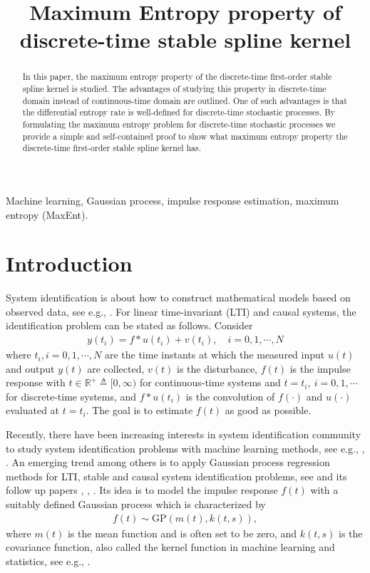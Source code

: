 \documentclass{article}
\title{Maximum Entropy property of discrete-time  stable spline kernel}
\begin{document}
\maketitle
\begin{abstract}
In this paper, the maximum entropy property of the discrete-time
first-order stable spline kernel is studied. The advantages of
studying this property in discrete-time domain instead of
continuous-time domain are outlined. One of such advantages is that
the differential entropy rate is well-defined for discrete-time
stochastic processes. By formulating the maximum entropy problem for
discrete-time stochastic processes we provide a simple and
self-contained proof to show what maximum entropy property
the discrete-time first-order stable spline kernel has.
\end{abstract}
\begin{keywords}
Machine learning, Gaussian process, impulse response estimation,
maximum entropy (MaxEnt).\end{keywords}
\section{Introduction}
\label{sec:intro} System identification is about how to construct
mathematical models based on observed data, see e.g.,
\cite{Ljung:99}. For linear time-invariant (LTI) and causal systems,
the identification problem can be stated as follows. Consider
\begin{align}
  y(t_i) = f*u(t_i) + v(t_i), \quad i=0,1,\cdots, N
\end{align}
where $t_i,i=0,1,\cdots,N$ are the time instants at which the
measured input $u(t)$ and output $y(t)$ are collected, $v(t)$ is the
disturbance, $f(t)$ is the impulse response with $t\in\mathbb
R^+\triangleq[0, \infty)$ for continuous-time systems and
$t=t_i,\ i=0,1,\cdots$ for discrete-time systems, and $f*u(t_i)$ is
the convolution of $f(\cdot)$ and $u(\cdot)$ evaluated at $t=t_i$.
The goal is to estimate $f(t)$ as good as possible.



Recently, there have been increasing interests in system
identification community to study system identification problems
with machine learning methods, see e.g., \cite{LHO:11},
\cite{PDCDL14}. An emerging trend among others is to apply Gaussian
process regression methods for LTI, stable and causal system
identification problems, see \cite{PN10a} and its follow up papers
\cite{PCN11}, \cite{COL12a}, \cite{CACLP14}. Its idea is to model
the impulse response $f(t)$ with a suitably defined Gaussian process
which is characterized by\begin{align}
f(t)\sim\text{GP}(m(t),k(t,s)),
\end{align} where $m(t)$ is the mean function and is often set to be
zero, and $k(t,s)$ is the covariance function, also called the
kernel function in machine learning and statistics, see e.g.,
\cite{RasmussenW:06}.
\end{document}

